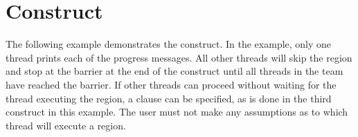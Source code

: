 \pagebreak
\section{ Construct}
\label{sec:single}

The following example demonstrates the  construct. In the example, 
only one thread prints each of the progress messages. All other threads will skip 
the  region and stop at the barrier at the end of the  
construct until all threads in the team have reached the barrier. If other threads 
can proceed without waiting for the thread executing the  region, 
a  clause can be specified, as is done in the third  
construct in this example. The user must not make any assumptions as to which thread 
will execute a  region.





